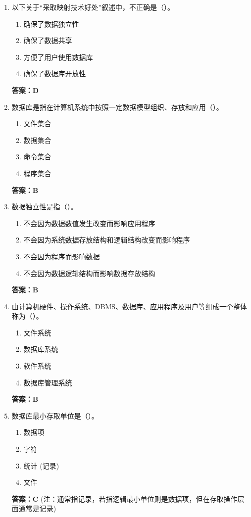 \documentclass[12pt, a4paper]{article}
\begin{document}
\begin{enumerate}[label=\arabic*.]
    \item 以下关于“采取映射技术好处”叙述中，不正确是（\quad）。
    \begin{enumerate}
        \item 确保了数据独立性
        \item 确保了数据共享
        \item 方便了用户使用数据库
        \item 确保了数据库开放性
    \end{enumerate}
    \textbf{答案：D}

    \item 数据库是指在计算机系统中按照一定数据模型组织、存放和应用（\quad）。
    \begin{enumerate}
        \item 文件集合
        \item 数据集合
        \item 命令集合
        \item 程序集合
    \end{enumerate}
    \textbf{答案：B}

    \item 数据独立性是指（\quad）。
    \begin{enumerate}
        \item 不会因为数据数值发生改变而影响应用程序
        \item 不会因为系统数据存放结构和逻辑结构改变而影响程序
        \item 不会因为程序而影响数据
        \item 不会因为数据逻辑结构而影响数据存放结构
    \end{enumerate}
    \textbf{答案：B}

    \item 由计算机硬件、操作系统、DBMS、数据库、应用程序及用户等组成一个整体称为（\quad）。
    \begin{enumerate}
        \item 文件系统
        \item 数据库系统
        \item 软件系统
        \item 数据库管理系统
    \end{enumerate}
    \textbf{答案：B}

    \item 数据库最小存取单位是（\quad）。
    \begin{enumerate}
        \item 数据项
        \item 字符
        \item 统计 (记录)
        \item 文件
    \end{enumerate}
    \textbf{答案：C} (注：通常指记录，若指逻辑最小单位则是数据项，但在存取操作层面通常是记录)


\end{enumerate}
\end{document}
